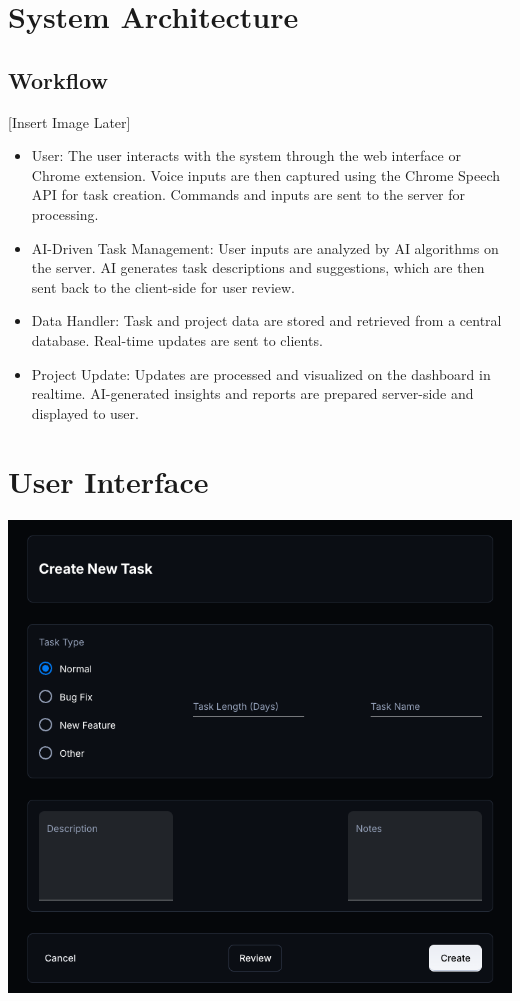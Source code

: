 \documentclass{article}
\begin{document}
\section{System Architecture}

\subsection{Workflow}

[Insert Image Later]

\begin{itemize}
    \item User: The user interacts with the system through the web interface or Chrome extension. Voice inputs are then captured using the Chrome Speech API for task creation. Commands and inputs are sent to the server for processing.
    \item AI-Driven Task Management: User inputs are analyzed by AI algorithms on the server. AI generates task descriptions and suggestions, which are then sent back to the client-side for user review.
    \item Data Handler: Task and project data are stored and retrieved from a central database. Real-time updates are sent to clients.
    \item Project Update: Updates are processed and visualized on the dashboard in realtime. AI-generated insights and reports are prepared server-side and displayed to user.
\end{itemize}

 
\section{User Interface}

\includegraphics[width=0.9\linewidth]{./logo/mockup.png} 
\end{document}
